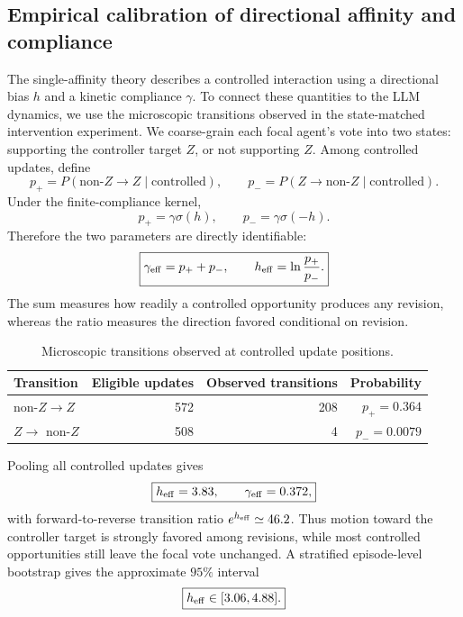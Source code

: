 
\subsection{Empirical calibration of directional affinity and compliance}
\label{subsec:effective_affinity}

The single-affinity theory describes a controlled interaction using a directional
bias $h$ and a kinetic compliance $\gamma$. To connect these quantities to the
LLM dynamics, we use the microscopic transitions observed in the state-matched
intervention experiment. We coarse-grain each focal agent's vote into two
states: supporting the controller target $Z$, or not supporting $Z$. Among
controlled updates, define
\[
p_+=P(\text{non-}Z\rightarrow Z\mid\text{controlled}),
\qquad
p_-=P(Z\rightarrow\text{non-}Z\mid\text{controlled}).
\]
Under the finite-compliance kernel,
\[
p_+=\gamma\sigma(h),
\qquad
p_-=\gamma\sigma(-h).
\]
Therefore the two parameters are directly identifiable:
\begin{equation}
\boxed{
\gamma_{\rm eff}=p_++p_-,
\qquad
h_{\rm eff}=\ln\frac{p_+}{p_-}.}
\label{eq:empirical_single_affinity_calibration}
\end{equation}
The sum measures how readily a controlled opportunity produces any revision,
whereas the ratio measures the direction favored conditional on revision.

\begin{table}[t]
\centering
\caption{Microscopic transitions observed at controlled update positions.}
\label{tab:effective_affinity_counts}
\begin{tabular}{lrrr}
\toprule
Transition & Eligible updates & Observed transitions & Probability \\
\midrule
non-$Z\rightarrow Z$ & 572 & 208 & $p_+=0.364$ \\
$Z\rightarrow$ non-$Z$ & 508 & 4 & $p_-=0.0079$ \\
\bottomrule
\end{tabular}
\end{table}

Pooling all controlled updates gives
\[
\boxed{h_{\rm eff}=3.83,\qquad \gamma_{\rm eff}=0.372,}
\]
with forward-to-reverse transition ratio $e^{h_{\rm eff}}\simeq46.2$. Thus
motion toward the controller target is strongly favored among revisions, while
most controlled opportunities still leave the focal vote unchanged. A
stratified episode-level bootstrap gives the approximate $95\%$ interval
\[
\boxed{h_{\rm eff}\in[3.06,4.88].}
\]

